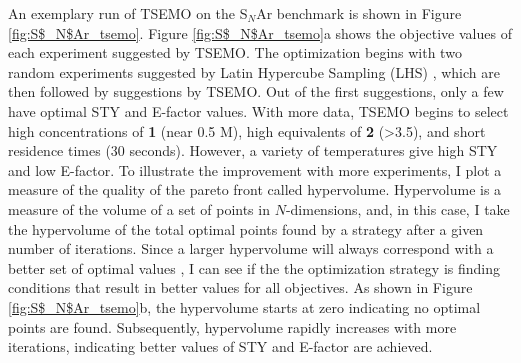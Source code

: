 An exemplary run of TSEMO on the S$_N$Ar benchmark is shown in Figure \ref{fig:S$_N$Ar_tsemo}. Figure \ref{fig:S$_N$Ar_tsemo}a shows the objective values of each experiment suggested by TSEMO. The optimization begins with two random experiments suggested by Latin Hypercube Sampling (LHS) \cite{McKay1979}, which are then followed by suggestions by TSEMO. Out of the first suggestions, only a few have optimal STY and E-factor values. With more data, TSEMO begins to select high concentrations of \textbf{1} (near 0.5 M), high equivalents of \textbf{2} (>3.5), and short residence times (30 seconds). However, a variety of temperatures give high STY and low E-factor. To illustrate the improvement with more experiments, I plot a measure of the quality of the pareto front called hypervolume. Hypervolume is a measure of the volume of a set of points in $N$-dimensions, and, in this case, I take the hypervolume of the total  optimal points found by a strategy after a given number of iterations. Since a larger hypervolume will always correspond with a better set of optimal values \cite{Zitzler2003}, I can see if the the optimization strategy is finding conditions that result in better values for all objectives. As shown in Figure \ref{fig:S$_N$Ar_tsemo}b, the hypervolume starts at zero indicating no optimal points are found. Subsequently, hypervolume rapidly increases with more iterations, indicating better values of STY and E-factor are achieved.

